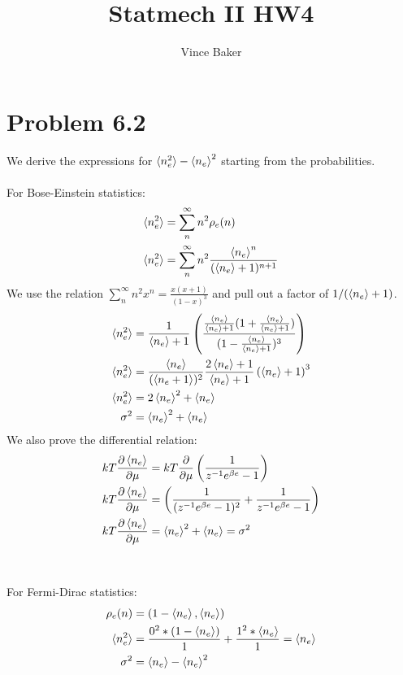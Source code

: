 \documentclass[a4paper,11pt]{article}
\title{Statmech II HW4}
\author{Vince Baker}
\numberwithin{equation}{section}
\begin{document}
\maketitle

\section{Problem 6.2}
We derive the expressions for $\braket{n_e^2}-\braket{n_e}^2$ starting from the probabilities.
\\ \\
For Bose-Einstein statistics:
\begin{align}
 \braket{n_e^2} &= \sum_n^\infty n^2 \rho_e (n)\\
 \braket{n_e^2} &= \sum_n^\infty n^2 \frac{\braket{n_e}^n}{(\braket{n_e}+1)^{n+1}}\\
\end{align}
We use the relation $\sum_n^\infty n^2x^n = \frac{x(x+1)}{(1-x)^3}$ and pull out a factor of $1/(\braket{n_e}+1)$.
\begin{align}
 \braket{n_e^2} &= \frac{1}{\braket{n_e}+1}\left(\frac{\frac{\braket{n_e}}{\braket{n_e}+1}(1+\frac{\braket{n_e}}{\braket{n_e}+1})}
		  {(1-\frac{\braket{n_e}}{\braket{n_e}+1})^3} \right)\\
 \braket{n_e^2} &= \frac{\braket{n_e}}{(\braket{n_e+1})^2}
		    \frac{2\braket{n_e}+1}{\braket{n_e}+1}\left(\braket{n_e}+1\right)^3\\
 \braket{n_e^2} &= 2\braket{n_e}^2+\braket{n_e}\\
 \sigma^2 &= \braket{n_e}^2+\braket{n_e}
\end{align}
We also prove the differential relation:
\begin{align}
 kT \frac{\partial \braket{n_e}}{\partial \mu} &= kT \frac{\partial}{\partial \mu}\left(\frac{1}{z^{-1}e^{\beta e}-1} \right)\\
 kT \frac{\partial \braket{n_e}}{\partial \mu} &= \left( \frac{1}{(z^{-1}e^{\beta e}-1)^2} + \frac{1}{z^{-1}e^{\beta e}-1}\right)\\
 kT \frac{\partial \braket{n_e}}{\partial \mu} &= \braket{n_e}^2+\braket{n_e} = \sigma^2
\end{align}
\\ \\
For Fermi-Dirac statistics:
\begin{align}
  \rho_e(n) &= \left(1-\braket{n_e},\braket{n_e} \right)\\ 
 \braket{n_e^2} &= \frac{0^2*(1-\braket{n_e})}{1}+\frac{1^2*\braket{n_e}}{1} = \braket{n_e}\\
 \sigma^2 &=\braket{n_e}-\braket{n_e}^2
\end{align}
\end{document}
